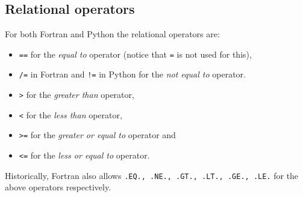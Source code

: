         
        \subsection*{Relational operators}
        \vspace{-0.5cm}
        For both Fortran and Python the relational operators are:
        \vspace{-0.5cm}
        \begin{itemize}[noitemsep]
            \item \texttt{==} for the \textit{equal to} operator (notice that \texttt{=} is not used for this), 
            \item \texttt{/=} in Fortran and \texttt{!=} in Python for the \textit{not equal to} operator.
            \item \texttt{>} for the \textit{greater than} operator,
            \item \texttt{<} for the \textit{less than} operator,
            \item \texttt{>=} for the \textit{greater or equal to} operator and
            \item \texttt{<=} for the \textit{less or equal to} operator.
        \end{itemize}
    \vspace{-0.5cm}
        Historically, Fortran also allows \texttt{.EQ., .NE., .GT., .LT., .GE., .LE.} for the above operators respectively. 
    
        
